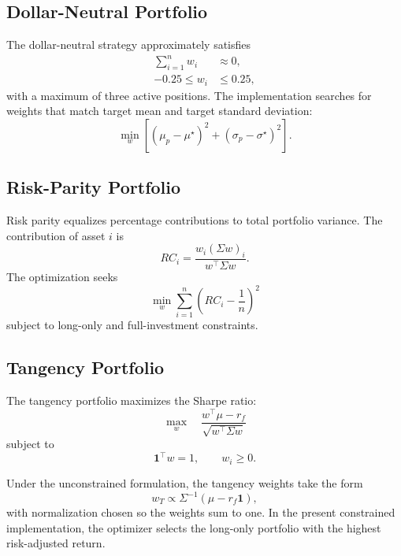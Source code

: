 \documentclass[wcp]{jmlr}
\begin{document}
\subsection{Dollar-Neutral Portfolio}

The dollar-neutral strategy approximately satisfies
\begin{align}
\sum_{i=1}^n w_i &\approx 0, \\
-0.25 \leq w_i &\leq 0.25,
\end{align}
with a maximum of three active positions. The implementation searches for weights that match target mean and target standard deviation:
\begin{equation}
\min_w \left[ (\mu_p - \mu^\star)^2 + (\sigma_p - \sigma^\star)^2 \right].
\end{equation}

\subsection{Risk-Parity Portfolio}

Risk parity equalizes percentage contributions to total portfolio variance. The contribution of asset $i$ is
\begin{equation}
RC_i = \frac{w_i (\Sigma w)_i}{w^\top \Sigma w}.
\end{equation}
The optimization seeks
\begin{equation}
\min_w \sum_{i=1}^n \left(RC_i - \frac{1}{n}\right)^2
\end{equation}
subject to long-only and full-investment constraints.

\subsection{Tangency Portfolio}

The tangency portfolio maximizes the Sharpe ratio:
\begin{equation}
\max_w \quad \frac{w^\top \mu - r_f}{\sqrt{w^\top \Sigma w}}
\end{equation}
subject to
\begin{equation}
\mathbf{1}^\top w = 1, \qquad w_i \geq 0.
\end{equation}

Under the unconstrained formulation, the tangency weights take the form
\begin{equation}
w_T \propto \Sigma^{-1}(\mu - r_f \mathbf{1}),
\end{equation}
with normalization chosen so the weights sum to one. In the present constrained implementation, the optimizer selects the long-only portfolio with the highest risk-adjusted return.
\end{document}
